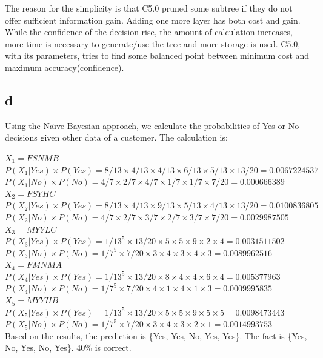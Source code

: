 \documentclass[12pt]{article}
\begin{document}
The reason for the simplicity is that C5.0 pruned some subtree if they do not offer sufficient information gain. Adding one more layer has both cost and gain. While the confidence of the decision rise, the amount of calculation increases, more time is necessary to generate/use the tree and more storage is used. C5.0, with its parameters, tries to find some balanced point between minimum cost and maximum accuracy(confidence).

\subsection{d}
Using the Na{\"\i}ve Bayesian approach, we calculate the probabilities of Yes or No decisions given other data of a customer. The calculation is:

$X_1 =  F S N M B$\\
$P(X_1|Yes) × P(Yes) = 8/13 × 4/13 × 4/13 × 6/13 × 5/13 × 13/20 = 0.0067224537$\\
$P(X_1|No) × P(No) = 4/7 × 2/7 × 4/7 × 1/7 × 1/7 × 7/20 = 0.000666389$\\

$X_2 = F S Y H C$\\
$P(X_2|Yes) × P(Yes) =8/13 × 4/13 × 9/13 × 5/13 × 4/13 × 13/20 = 0.0100836805$\\
$P(X_2|No) × P(No) =4/7 × 2/7 × 3/7 × 2/7 × 3/7 × 7/20 = 0.0029987505$\\

$X_3 = M Y Y L C$\\
$P(X_3|Yes) × P(Yes) =1/13^5 × 13/20 × 5 × 5 × 9 × 2 × 4 = 0.0031511502$\\
$P(X_3|No) × P(No) =1/7^5 × 7/20 × 3 × 4 × 3 × 4 × 3 = 0.0089962516$\\

$X_4 = F M N M A$\\
$P(X_4|Yes) × P(Yes) =1/13^5 × 13/20 ×8 × 4 × 4 × 6 × 4 = 0.005377963$\\
$P(X_4|No) × P(No) =1/7^5 × 7/20 × 4 × 1 × 4 × 1 × 3 = 0.0009995835$\\

$X_5 = M Y Y H B$\\
$P(X_5|Yes) × P(Yes) =1/13^5 × 13/20 ×5 × 5 × 9 × 5 × 5 = 0.0098473443$\\
$P(X_5|No) × P(No) =1/7^5 × 7/20 × 3 × 4 × 3 × 2 × 1 = 0.0014993753$\\

Based on the results, the prediction is \{Yes, Yes, No, Yes, Yes\}. The fact is \{Yes, No, Yes, No, Yes\}. 40\% is correct.
\end{document}

